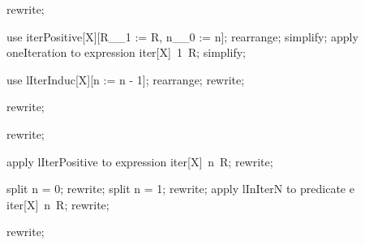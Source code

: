 \begin{LPScript}\begin{forget}[lIterBase]
rewrite;
\end{forget}\end{LPScript}

\begin{LPScript}\begin{forget}[lIterInduc]
use iterPositive[X][R\_\_1 := R, n\_\_0 := n];
rearrange;
simplify;
apply oneIteration to expression iter[X]~1~R;
simplify;
\end{forget}\end{LPScript}

\begin{LPScript}\begin{forget}[lIterPositive]
use lIterInduc[X][n := n - 1];
rearrange;
rewrite;
\end{forget}\end{LPScript}

\begin{LPScript}\begin{forget}[lInIterZero]
rewrite;
\end{forget}\end{LPScript}

\begin{LPScript}\begin{forget}[lInIterOne]
rewrite;
\end{forget}\end{LPScript}

\begin{LPScript}\begin{forget}[lInIterN]
apply lIterPositive to expression iter[X]~n~R;
rewrite;
\end{forget}\end{LPScript}

\begin{LPScript}\begin{forget}[lInIterAny]
split n = 0;
rewrite;
split n = 1;
rewrite;
apply lInIterN to predicate e \in  iter[X]~n~R;
rewrite;
\end{forget}\end{LPScript}

\begin{LPScript}\begin{forget}[lIterIsTotalOnN]
rewrite;
\end{forget}\end{LPScript}

\begin{LPScript}\end{LPScript}


